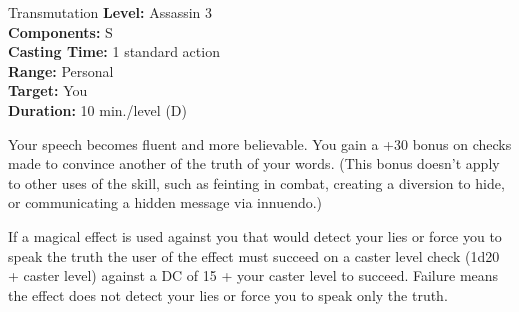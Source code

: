 {Transmutation}
{
	\textbf{Level:}
	Assassin 3\\
	\textbf{Components:}
	S\\
	\textbf{Casting Time:}
	1 standard action\\
	\textbf{Range:}
	Personal\\
	\textbf{Target:}
	You\\
	\textbf{Duration:}
	10 min./level (D)\\
}
{
	Your speech becomes fluent and more believable. You gain a +30 bonus on  checks made to convince another of the truth of your words. (This bonus doesn't apply to other uses of the  skill, such as feinting in combat, creating a diversion to hide, or communicating a hidden message via innuendo.)

	If a magical effect is used against you that would detect your lies or force you to speak the truth the user of the effect must succeed on a caster level check (1d20 + caster level) against a DC of 15 + your caster level to succeed. Failure means the effect does not detect your lies or force you to speak only the truth.

}
